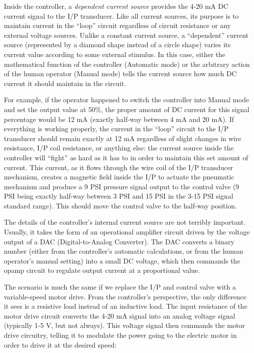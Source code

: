 Inside the controller, a \textit{dependent current source} provides the 4-20 mA DC current signal to the I/P transducer.  Like all current sources, its purpose is to maintain current in the ``loop'' circuit regardless of circuit resistance or any external voltage sources.  Unlike a constant current source, a ``dependent'' current source (represented by a diamond shape instead of a circle shape) varies its current value according to some external stimulus.  In this case, either the mathematical function of the controller (Automatic mode) or the arbitrary action of the human operator (Manual mode) tells the current source how much DC current it should maintain in the circuit. 

For example, if the operator happened to switch the controller into Manual mode and set the output value at 50\%, the proper amount of DC current for this signal percentage would be 12 mA (exactly half-way between 4 mA and 20 mA).  If everything is working properly, the current in the ``loop'' circuit to the I/P transducer should remain exactly at 12 mA regardless of slight changes in wire resistance, I/P coil resistance, or anything else: the current source inside the controller will ``fight'' as hard as it has to in order to maintain this set amount of current.  This current, as it flows through the wire coil of the I/P transducer mechanism, creates a magnetic field inside the I/P to actuate the pneumatic mechanism and produce a 9 PSI pressure signal output to the control valve (9 PSI being exactly half-way between 3 PSI and 15 PSI in the 3-15 PSI signal standard range).  This should move the control valve to the half-way position.

The details of the controller's internal current source are not terribly important.  Usually, it takes the form of an operational amplifier circuit driven by the voltage output of a DAC (Digital-to-Analog Converter).  The DAC converts a binary number (either from the controller's automatic calculations, or from the human operator's manual setting) into a small DC voltage, which then commands the opamp circuit to regulate output current at a proportional value.

\vskip 10pt

The scenario is much the same if we replace the I/P and control valve with a variable-speed motor drive.  From the controller's perspective, the only difference it sees is a resistive load instead of an inductive load.  The input resistance of the motor drive circuit converts the 4-20 mA signal into an analog voltage signal (typically 1-5 V, but not always).  This voltage signal then commands the motor drive circuitry, telling it to modulate the power going to the electric motor in order to drive it at the desired speed:

